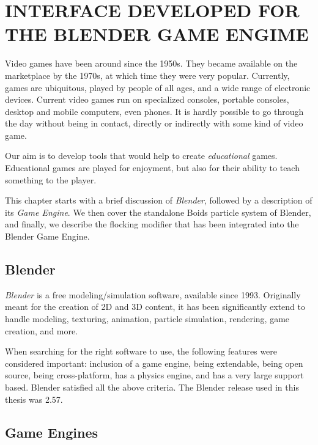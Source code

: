 \chapter{INTERFACE DEVELOPED FOR THE BLENDER GAME ENGIME}\label{chap5}


Video games have been around since the 1950s\cite{historyVideoGames}. They became available on the marketplace by the 1970s, at which time they were very popular. Currently, games are ubiquitous, played by people of all ages, and a wide range of electronic devices. Current video games run on specialized consoles, portable consoles, desktop and mobile computers, even phones. It is hardly possible to go through the day without being in contact, directly or indirectly with some kind of video game.

Our aim is to develop tools that would help to create \textit{educational} games. Educational games are played for enjoyment, but also for their ability to teach something to the player. 

This chapter starts with a brief discussion of \textit{Blender}, followed by a description of its \textit{Game Engine}. We then cover the standalone Boids particle system of Blender, and finally, we describe the flocking modifier that has been integrated into the Blender Game Engine. 


\section{Blender}\label{blenderSec}
\textit{Blender}\cite{blenderWeb} is a free modeling/simulation software, available since 1993. Originally meant for the creation of 2D and 3D content, it has been significantly extend to handle modeling, texturing, animation, particle simulation, rendering, game creation, and more. 

When searching for the right software to use, the following features were considered important: inclusion of a game engine, being extendable, being open source, being cross-platform, has a physics engine, and has a very large support based. Blender satisfied all the above criteria. The Blender release used in this thesis was 2.57.

\section{Game Engines}


